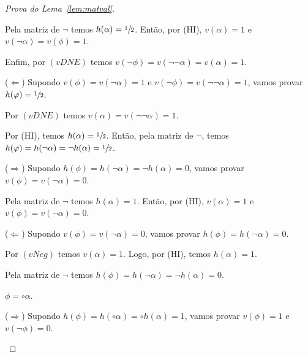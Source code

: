 \begin{proof}[Prova do Lema~\ref{lem:matval}]
\begin{provaporcasos}
\begin{provaporsubcasos}
                        Pela matriz de $\neg$ temos $h(\alpha) = \sfrac{1}{2}{}$. Então, por (HI), $v(\alpha) = 1$ e $v(\neg \alpha) = v(\phi) = 1$.
                        
                        Enfim, por $(vDNE)$ temos $v(\neg \phi) = v(\neg \neg \alpha) = v(\alpha) = 1$.
                        
                        ($\Longleftarrow$) Supondo $v(\phi) = v(\neg \alpha) = 1$ e $v(\neg \phi) = v(\neg \neg \alpha)= 1$, vamos provar $h(\varphi) = \sfrac{1}{2}{}$.

                        Por $(vDNE)$ temos $v(\alpha) = v(\neg \neg \alpha) = 1$.
                        
                        Por (HI), temos $h(\alpha) = \sfrac{1}{2}{}$. Então, pela matriz de $\neg$, temos $h(\varphi) = h(\neg \alpha) = \neg h(\alpha) = \sfrac{1}{2}{}$.
                    
                        
                        ($\Longrightarrow$) Supondo $h(\phi) = h(\neg \alpha) = \neg h(\alpha) = 0$, vamos provar $v(\phi) = v(\neg \alpha) = 0$.
                        
                        Pela matriz de $\neg$ temos $h(\alpha) = 1$. Então, por (HI), $v(\alpha) = 1$ e $v(\phi) = v(\neg \alpha) = 0$.
                    
                        ($\Longleftarrow$) Supondo $v(\phi) = v(\neg \alpha) = 0$, vamos provar $h(\phi) = h(\neg \alpha) = 0$.
                    
                        Por $(vNeg)$ temos $v(\alpha) = 1$. Logo, por (HI), temos $h(\alpha) = 1$.
                        
                        Pela matriz de $\neg$ temos $h(\phi) = h(\neg \alpha) = \neg h(\alpha) = 0$.
                \end{provaporsubcasos}
                    
            \casodeprova{} $\phi = \circ \alpha$.
                    
                \begin{provaporsubcasos}
                    

                        ($\Longrightarrow$) Supondo $h(\phi) = h(\circ \alpha) = \circ h(\alpha) = 1$, vamos provar $v(\phi) = 1$ e $v(\neg \phi) = 0$.
                        

\end{provaporsubcasos}
\end{provaporcasos}
\end{proof}
